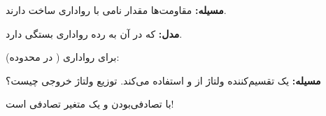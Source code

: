 

\textbf{مسیله:} مقاومت‌ها مقدار نامی  با رواداری ساخت دارند.

\textbf{مدل:}  که در آن  به رده رواداری بستگی دارد.

برای رواداری  ( در محدوده): 


\textbf{مسیله:} یک تقسیم‌کننده ولتاژ از  و  استفاده می‌کند. توزیع ولتاژ خروجی چیست؟


با تصادفی‌بودن  و  یک متغیر تصادفی است!


